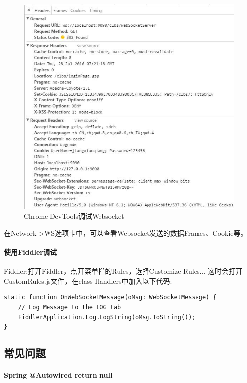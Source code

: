 \documentclass{book}
\begin{document}
\begin{figure}[htbp]
	\centering
	\includegraphics[scale=0.6]{ChromeWebsocketDebugger.jpg}
	\caption{Chrome DevTools调试Websocket}
	\label{fig:ChromeWebsocketDebugger}
\end{figure}

在Network->WS选项卡中，可以查看Websocket发送的数据Frames、Cookie等。

\paragraph{使用Fiddler调试}Fiddler:打开Fiddler，点开菜单栏的Rules，选择Customize Rules...
这时会打开CustomRules.js文件，在class Handlers中加入以下代码:

\begin{lstlisting}[language={[Sharp]C}]
static function OnWebSocketMessage(oMsg: WebSocketMessage) {
	// Log Message to the LOG tab
	FiddlerApplication.Log.LogString(oMsg.ToString());
}
\end{lstlisting}

\subsection{常见问题}

\paragraph{Spring @Autowired return null}
\end{document}
